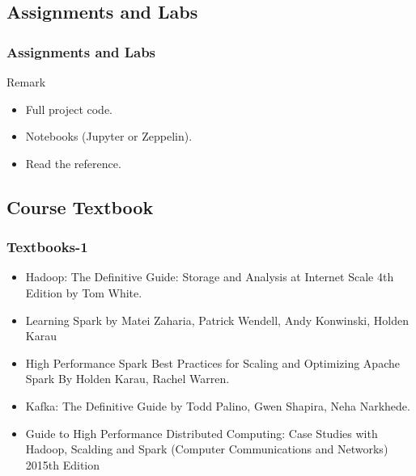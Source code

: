 \subsection{Assignments and Labs}


\begin{frame}
\frametitle{Assignments and Labs}
\begin{block}{Remark}


\begin{itemize}
	\item<1-> Full project code.
	\item<2-> Notebooks (Jupyter or Zeppelin).
	\item<3-> Read the reference.
\end{itemize}
\end{block}

\end{frame}



\subsection{Course Textbook}


\begin{frame}
\frametitle{Textbooks-1}

	\begin{itemize}
		\item<1-> Hadoop: The Definitive Guide: Storage and Analysis at Internet Scale 4th Edition by Tom White.
		\item<2-> Learning Spark by Matei Zaharia, Patrick Wendell, Andy Konwinski, Holden Karau
		\item<3-> High Performance Spark Best Practices for Scaling and Optimizing Apache Spark By Holden Karau, Rachel Warren.
		\item<4-> Kafka: The Definitive Guide by Todd Palino, Gwen Shapira, Neha Narkhede.
		\item<5-> Guide to High Performance Distributed Computing: Case Studies with Hadoop, Scalding and Spark (Computer Communications and Networks) 2015th Edition
				
	\end{itemize}

\end{frame}

